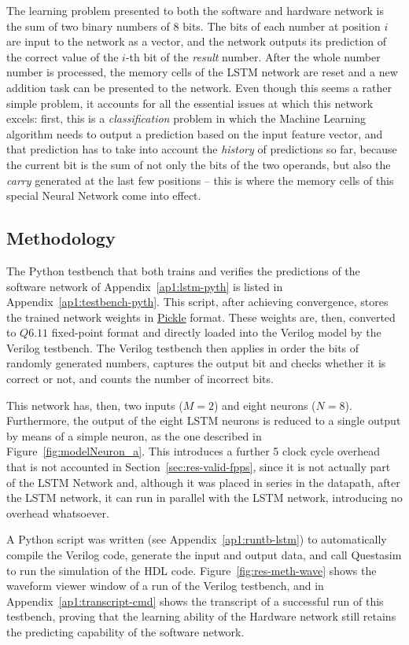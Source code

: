 The learning problem presented to both the software and hardware network is the sum of two binary numbers of 8 bits. The bits of each number at position $i$ are input to the network as a vector, and the network outputs its prediction of the correct value of the $i$-th bit of the \emph{result} number. After the whole number number is processed, the memory cells of the LSTM network are reset and a new addition task can be presented to the network. Even though this seems a rather simple problem, it accounts for all the essential issues at which this network excels: first, this is a \emph{classification} problem in which the Machine Learning algorithm needs to output a prediction based on the input feature vector, and that prediction has to take into account the \emph{history} of predictions so far, because the current bit is the sum of not only the bits of the two operands, but also the \emph{carry} generated at the last few positions -- this is where the memory cells of this special Neural Network come into effect.  

\subsection{Methodology}\label{sec:res-meth}
The Python testbench that both trains and verifies the predictions of the software network of Appendix~\ref{ap1:lstm-pyth} is listed in Appendix~\ref{ap1:testbench-pyth}. This script, after achieving convergence, stores the trained network weights in \href{https://docs.python.org/3/library/pickle.html}{Pickle} format. These weights are, then, converted to $Q6.11$ fixed-point format and directly loaded into the Verilog model by the Verilog testbench. The Verilog testbench then applies in order the bits of randomly generated numbers, captures the output bit and checks whether it is correct or not, and counts the number of incorrect bits.

This network has, then, two inputs ($M=2$) and eight neurons ($N=8$). Furthermore, the output of the eight LSTM neurons is reduced to a single output by means of a simple neuron, as the one described in Figure~\ref{fig:modelNeuron_a}. This introduces a further 5 clock cycle overhead that is not accounted in Section~\ref{sec:res-valid-fpps}, since it is not actually part of the LSTM Network and, although it was placed in series in the datapath, after the LSTM network, it can run in parallel with the LSTM network, introducing no overhead whatsoever.

A Python script was written (see Appendix~\ref{ap1:runtb-lstm}) to automatically compile the Verilog code, generate the input and output data, and call Questasim to run the simulation of the HDL code. Figure~\ref{fig:res-meth-wave} shows the waveform viewer window of a run of the Verilog testbench, and in Appendix~\ref{ap1:transcript-cmd} shows the transcript of a successful run of this testbench, proving that the learning ability of the Hardware network still retains the predicting capability of the software network. 

